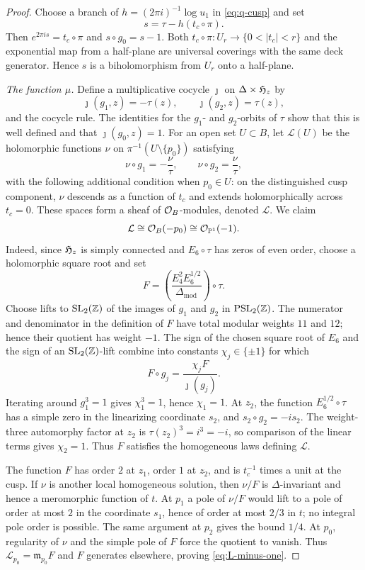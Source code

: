 \begin{proof}
Choose a branch of $h=(2\pi i)^{-1}\log u_1$ in
\eqref{eq:q-cusp} and set
\begin{equation}\label{eq:s-cusp}
 s=\tau-h(t_c\circ\pi).
\end{equation}
Then $e^{2\pi is}=t_c\circ\pi$ and $s\circ g_0=s-1$.  Both
$t_c\circ\pi:U_r\to\{0<|t_c|<r\}$ and the exponential map from a
half-plane are universal coverings with the same deck generator.  Hence
$s$ is a biholomorphism from $U_r$ onto a half-plane.

\smallskip
\noindent\emph{The function $\mu$.}
Define a multiplicative cocycle $\jmath$ on $\Delta\times\mathfrak H_z$ by
\[
 \jmath(g_1,z)=-\tau(z),
 \qquad
 \jmath(g_2,z)=\tau(z),
\]
and the cocycle rule.  The identities for the $g_1$- and $g_2$-orbits of
$\tau$ show that this is well defined and that $\jmath(g_0,z)=1$.
For an open set $U\subset B$, let $\mathcal L(U)$ be the holomorphic
functions $\nu$ on $\pi^{-1}(U\setminus\{p_0\})$ satisfying
\[
 \nu\circ g_1=-\frac\nu\tau,
 \qquad
 \nu\circ g_2=\frac\nu\tau,
\]
with the following additional condition when $p_0\in U$: on the
distinguished cusp component, $\nu$ descends as a function of $t_c$ and
extends holomorphically across $t_c=0$.  These spaces form a sheaf of
$\mathcal O_B$-modules, denoted $\mathcal L$.
We claim
\begin{equation}\label{eq:L-minus-one}
 \mathcal L\cong\mathcal O_B(-p_0)\cong\mathcal O_{\mathbb P^1}(-1).
\end{equation}
Indeed, since $\mathfrak H_z$ is simply connected and $E_6\circ\tau$ has zeros
of even order, choose a holomorphic square root and set
\[
 F=\left(\frac{E_4^2E_6^{1/2}}{\Delta_{\mathrm{mod}}}\right)\circ\tau.
\]
Choose lifts to $\mathrm{SL}_2(\mathbb Z)$ of the images of $g_1$ and
$g_2$ in $\mathrm{PSL}_2(\mathbb Z)$.  The numerator and denominator in the
definition of $F$ have total modular weights $11$ and $12$; hence their
quotient has weight $-1$.  The sign of the chosen square root of $E_6$
and the sign of an $\mathrm{SL}_2(\mathbb Z)$-lift combine into constants
$\chi_j\in\{\pm1\}$ for which
\[
 F\circ g_j=\frac{\chi_jF}{\jmath(g_j)}.
\]
Iterating around $g_1^3=1$ gives $\chi_1^3=1$, hence $\chi_1=1$.
At $z_2$, the function $E_6^{1/2}\circ\tau$ has a simple zero in the
linearizing coordinate $s_2$, and $s_2\circ g_2=-is_2$.  The weight-three
automorphy factor at $z_2$ is $\tau(z_2)^3=i^3=-i$, so comparison of the
linear terms gives $\chi_2=1$.  Thus $F$ satisfies the homogeneous laws
defining $\mathcal L$.

The function $F$ has order $2$ at $z_1$, order $1$ at $z_2$, and is
$t_c^{-1}$ times a unit at the cusp.  If $\nu$ is another local
homogeneous solution, then $\nu/F$ is $\Delta$-invariant and hence a
meromorphic function of $t$.  At $p_1$ a pole of $\nu/F$ would lift to a
pole of order at most $2$ in the coordinate $s_1$, hence of order at most
$2/3$ in $t$; no integral pole order is possible.  The same argument at
$p_2$ gives the bound $1/4$.  At $p_0$, regularity of $\nu$ and the simple
pole of $F$ force the quotient to vanish.  Thus
$\mathcal L_{p_0}=\mathfrak m_{p_0}F$ and $F$ generates elsewhere,
proving \eqref{eq:L-minus-one}.


\end{proof}

